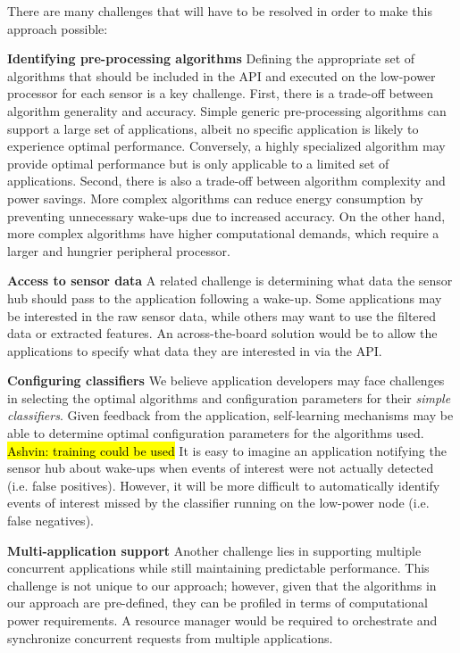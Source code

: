 There are many challenges that will have to be resolved in order to
make this approach possible:

{\bf Identifying pre-processing algorithms} Defining the appropriate
set of algorithms that should be included in the API and executed on
the low-power processor for each sensor is a key challenge. First,
there is a trade-off between algorithm generality and accuracy.
Simple generic pre-processing algorithms can support a large set of
applications, albeit no specific application is likely to experience
optimal performance.  Conversely, a highly specialized algorithm may
provide optimal performance but is only applicable to a limited set of
applications.  Second, there is also a trade-off between algorithm
complexity and power savings.  More complex algorithms can reduce
energy consumption by preventing unnecessary wake-ups due to increased
accuracy. On the other hand, more complex algorithms have higher
computational demands, which require a larger and hungrier peripheral
processor.

{\bf Access to sensor data} A related challenge is determining what
data the sensor hub should pass to the application following a
wake-up. Some applications may be interested in the raw sensor data,
while others may want to use the filtered data or extracted features.
An across-the-board solution would be to allow the applications to
specify what data they are interested in via the API.

{\bf Configuring classifiers} We believe application developers may
face challenges in selecting the optimal algorithms and configuration
parameters for their {\em simple classifiers}. Given feedback from the
application, self-learning mechanisms may be able to determine optimal
configuration parameters for the algorithms used. \hl{Ashvin: training
  could be used} It is easy to imagine an application notifying the
sensor hub about wake-ups when events of interest were not actually
detected (i.e.  false positives).  However, it will be more difficult
to automatically identify events of interest missed by the classifier
running on the low-power node (i.e. false negatives).

{\bf Multi-application support} Another challenge lies in supporting
multiple concurrent applications while still maintaining predictable
performance.  This challenge is not unique to our approach; however,
given that the algorithms in our approach are pre-defined, they can be
profiled in terms of computational power requirements. A resource
manager would be required to orchestrate and synchronize concurrent
requests from multiple applications.

